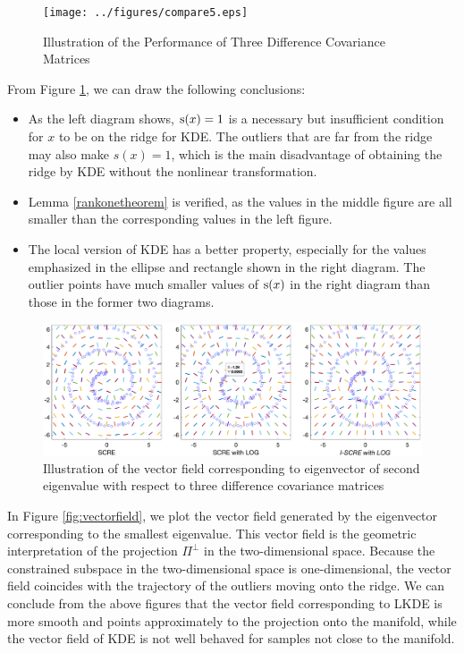 \documentclass[aos,preprint]{imsart}
\theoremstyle{remark}
\begin{document}
 \begin{figure} %
    \texttt{[image: ../figures/compare5.eps]} 
    \caption{Illustration of the Performance of Three Difference Covariance Matrices }
    \label{fig:Diff Covariance}
 \end{figure}

 From Figure \ref{fig:Diff Covariance}, we can draw the following conclusions:
 \begin{itemize}
 \item As the left diagram shows, ${\rm s}(x)=1$ is a necessary but insufficient condition for $x$ to be on the ridge for KDE. The outliers that are far from the ridge may also make $s(x)=1$, which is the main disadvantage of obtaining the ridge by KDE without the nonlinear transformation. 
 \item Lemma \ref{rankonetheorem} is verified, as the values in the middle figure are all smaller than the corresponding values in the left figure.
\item The local version of KDE has a better property, especially for the values emphasized in the ellipse and rectangle shown in the right diagram. The outlier points have much smaller values of ${\rm s}(x)$ in the right diagram than those in the former two diagrams. 
 \end{itemize}
 
   \begin{figure} %
    \includegraphics[width=\linewidth]{vectorfield.eps} 
    \caption{Illustration of the vector field corresponding to eigenvector of second eigenvalue with respect to three difference covariance matrices }
    \label{fig:vectorfield}
 \end{figure}
 In Figure \eqref{fig:vectorfield}, we plot the vector field generated by the eigenvector corresponding to the smallest eigenvalue. This vector field is the geometric interpretation of the projection $\Pi^{\perp}$ in the two-dimensional space. Because the constrained subspace in the two-dimensional space is one-dimensional, the vector field coincides with the trajectory of the outliers moving onto the ridge. We can conclude from the above figures that the vector field corresponding to LKDE is more smooth and points approximately to the projection onto the manifold, while the vector field of KDE is not well behaved for samples not close to the manifold.
\end{document}
